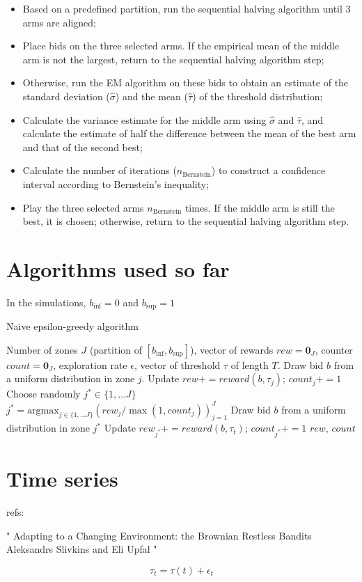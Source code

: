 \documentclass[11pt]{article}
\begin{document}
\begin{itemize}
  \item Based on a predefined partition, run the sequential halving algorithm until 3 arms are aligned;
  \item Place bids on the three selected arms. If the empirical mean of the middle arm is not the largest, return to the sequential halving algorithm step;
  \item Otherwise, run the EM algorithm on these bids to obtain an estimate of the standard deviation ($\hat{\sigma}$) and the mean ($\hat{\tau}$) of the threshold distribution;
  \item Calculate the variance estimate for the middle arm using $\hat{\sigma}$ and $\hat{\tau}$, and calculate the estimate of half the difference between the mean of the best arm and that of the second best;
  \item Calculate the number of iterations ($n_{\text{Bernstein}}$) to construct a confidence interval according to Bernstein's inequality;
  \item Play the three selected arms $n_{\text{Bernstein}}$ times. If the middle arm is still the best, it is chosen; otherwise, return to the sequential halving algorithm step.
\end{itemize}

\section{Algorithms used so far}

In the simulations, $b_{\inf} = 0$ and $b_{\sup} = 1$

\begin{algorithm}[H]
  \caption{Naive epsilon-greedy algorithm}
  \label{code:epsilon_greedy}
  \begin{algorithmic}[0]
  \Require Number of zones $J$ (partition of $[b_{\inf}, b_{\sup}]$), vector of rewards $rew = \mathbf{0}_J$, counter $count = \mathbf{0}_J$, exploration rate $\epsilon$,
  vector of threshold $\tau$ of length $T$.
   
  \State Draw bid $b$ from a uniform distribution in zone $j$.
  \State Update $rew += reward(b, \tau_j)$; $count_j += 1$
  \EndFor
   
  \State Choose randomly $j^* \in \{1, \dots J\}$
  \Else {}
  \State $j^* = \text{argmax}_{j \in \{1, \dots J\}} (rew_j / \max(1, count_j))_{j=1}^J$
  \EndIf
  \State Draw bid $b$ from a uniform distribution in zone $j^*$
  \State Update $rew_{j^*} += reward(b, \tau_t)$; $count_{j^*} += 1$
  \EndFor
  \State \Return $rew$, $count$
\end{algorithmic}
\end{algorithm}

\section{Time series}
refs:

"
Adapting to a Changing Environment: the Brownian Restless Bandits
Aleksandrs Slivkins
and Eli Upfal
"

$$\tau_t = \tau(t) + \epsilon_t$$ 
\newpage
%
\end{document}
